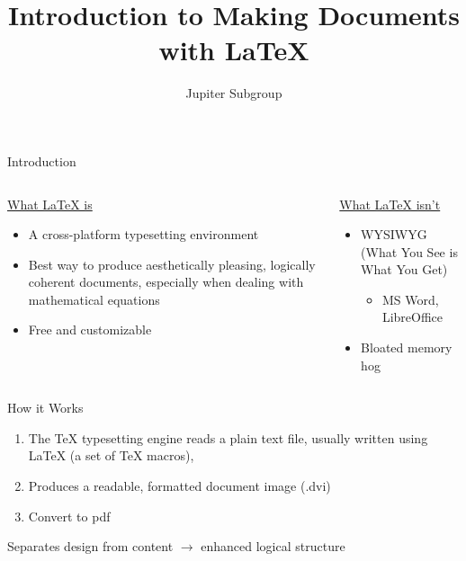 \documentclass[11pt]{beamer}
\author{Jupiter Subgroup}
\title{Introduction to Making Documents with \LaTeX}
\begin{document}
\begin{frame}
\titlepage
\end{frame}


%
%
\begin{frame}{Introduction}
\begin{columns}
	\begin{column}{6cm}
		\underline{What \LaTeX{} is}
		\begin{itemize}
			\item	A cross-platform typesetting environment
			\item 	Best way to produce aesthetically pleasing, logically coherent documents, especially when dealing with mathematical equations
			\item 	Free and customizable
		\end{itemize}
	\end{column}
		\begin{column}{5cm}
		\underline{What \LaTeX{} isn't}
		\begin{itemize}
			\item WYSIWYG (What You See is What You Get)
				\begin{itemize}
					\item MS Word, LibreOffice
				\end{itemize}
			\item Bloated memory hog
		\end{itemize}
	\end{column}
	\end{columns}
\end{frame}

%
%
\begin{frame}{How it Works}
\begin{enumerate}
	\item The \TeX{} typesetting engine reads a plain text file, usually written using \LaTeX{} (a set of \TeX{} macros), 
	\item<2-> Produces a readable, formatted document image (.dvi)
	\item<3-> Convert to pdf
\end{enumerate}
 {Separates design from content $\rightarrow$ enhanced logical structure}
\end{frame}
\end{document}
